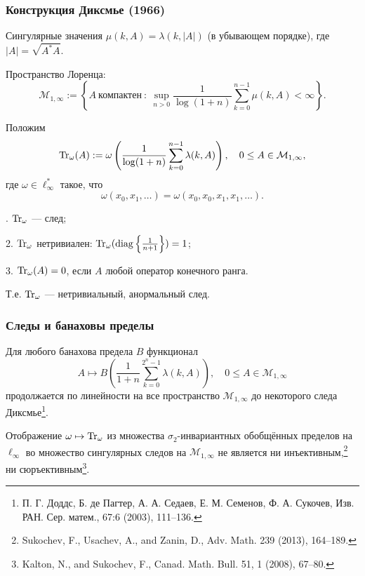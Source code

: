  \begin{frame}\frametitle{Конструкция Диксмье (1966)}

	Сингулярные значения $\mu(k,A)=\lambda(k,|A|)$ (в убывающем порядке),
	где $|A|=\sqrt{A^*A}$.

	Пространство Лоренца:
	$$\mathcal M_{1,\infty} := \left\{ A \ \text{компактен} \ : \ \sup_{n> 0}  \frac{1}{\log(1+n)} \sum_{k=0}^{n-1} \mu(k,A) < \infty \right \}.$$

	Положим
	$${\rm Tr}_\omega (A):= \omega \left( \frac{1}{\log(1+n)} \sum_{k=0}^{n-1} \lambda(k,A) \right), \quad 0\le A \in \mathcal M_{1,\infty},$$
	где $\omega\in \ell_\infty^*$ такое, что
	$$\omega(x_0, x_1, \dots)=\omega(x_0, x_0, x_1, x_1, \dots).$$


	. ${\rm Tr}_\omega$ --- след;

	2. ${\rm Tr}_\omega$ нетривиален: ${\rm Tr}_\omega ({\rm diag} \left\{ \frac1{n+1} \right\})=1$;

	3. ${\rm Tr}_\omega(A)=0$, если $A$ любой оператор конечного ранга.
	\bigskip

	\begin{center}
	Т.е. ${\rm Tr}_\omega$ --- нетривиальный, анормальный след.
	\end{center}
\end{frame}





\begin{frame}\frametitle{Следы и банаховы пределы}
	 Для любого банахова предела $B$ функционал
	 $$A \mapsto B \left( \frac{1}{1+n} \sum_{k=0}^{2^n-1} \lambda(k,A) \right), \quad 0\le A \in \mathcal M_{1,\infty}$$
	продолжается по линейности на все пространство $\mathcal M_{1,\infty}$ до некоторого следа Диксмье\footnote{П. Г. Доддс, Б. де Пагтер, А. А. Седаев, Е. М. Семенов, Ф. А. Сукочев, Изв. РАН. Сер. матем., 67:6 (2003),  111–136.}.

	\vfill

		Отображение $\omega \mapsto {\rm Tr}_\omega$ из множества $\sigma_2$-инвариантных обобщённых пределов на $\ell_\infty$ во множество сингулярных следов на $\mathcal M_{1,\infty}$ не является ни инъективным,\footnote{Sukochev, F., Usachev, A., and Zanin, D., Adv. Math. 239 (2013), 164--189.
	} ни сюръективным\footnote{Kalton, N., and Sukochev, F., Canad. Math. Bull. 51, 1 (2008), 67--80.}.
\end{frame}




